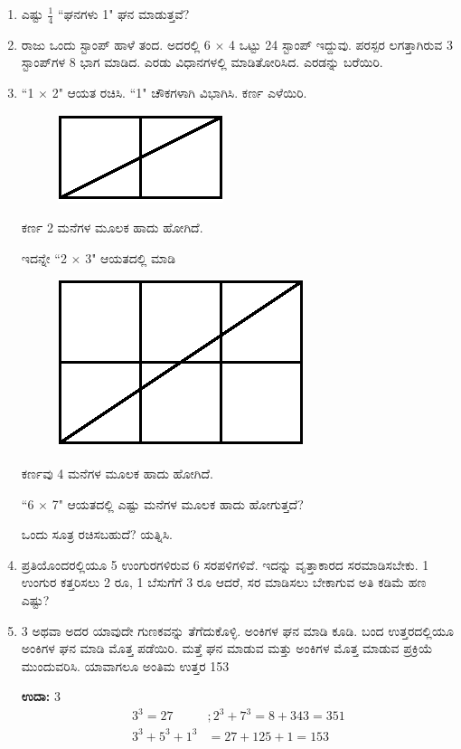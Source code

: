 \begin{enumerate}
\item ಎಷ್ಟು $\frac{1}{4}$ “ಘನಗಳು 1" ಘನ ಮಾಡುತ್ತವೆ?

\item ರಾಜು ಒಂದು ಸ್ಟಾಂಪ್ ಹಾಳೆ ತಂದ. ಅದರಲ್ಲಿ 6 $\times$ 4 ಒಟ್ಟು 24 ಸ್ಟಾಂಪ್ ಇದ್ದುವು. ಪರಸ್ಪರ ಲಗತ್ತಾಗಿರುವ 3 ಸ್ಟಾಂಪ್‌ಗಳ 8 ಭಾಗ ಮಾಡಿದ. ಎರಡು ವಿಧಾನಗಳಲ್ಲಿ ಮಾಡಿತೋರಿಸಿದ. ಎರಡನ್ನು ಬರೆಯಿರಿ.

\item “1 $\times$ 2" ಆಯತ ರಚಿಸಿ. “1" ಚೌಕಗಳಾಗಿ ವಿಭಾಗಿಸಿ. ಕರ್ಣ ಎಳೆಯಿರಿ. 
\begin{figure}[H]
\centering
\includegraphics{images/chap1/q25a.eps}
\end{figure}

ಕರ್ಣ 2 ಮನೆಗಳ ಮೂಲಕ ಹಾದು ಹೋಗಿದೆ.


ಇದನ್ನೇ “2 $\times$ 3" ಆಯತದಲ್ಲಿ ಮಾಡಿ 
\begin{figure}[H]
\centering
\includegraphics{images/chap1/q25b.eps}
\end{figure}

ಕರ್ಣವು 4 ಮನೆಗಳ ಮೂಲಕ ಹಾದು ಹೋಗಿದೆ. 


“6 $\times$ 7" ಆಯತದಲ್ಲಿ ಎಷ್ಟು ಮನೆಗಳ ಮೂಲಕ ಹಾದು ಹೋಗುತ್ತದೆ? 

ಒಂದು ಸೂತ್ರ ರಚಿಸಬಹುದೆ? ಯತ್ನಿಸಿ.

\item ಪ್ರತಿಯೊಂದರಲ್ಲಿಯೂ 5 ಉಂಗುರಗಳಿರುವ 6 ಸರಪಳಿಗಳಿವೆ. ಇದನ್ನು ವೃತ್ತಾಕಾರದ ಸರಮಾಡಿಸಬೇಕು. 1 ಉಂಗುರ ಕತ್ತರಿಸಲು 2 ರೂ, 1 ಬೆಸುಗೆಗೆ 3 ರೂ ಆದರೆ, ಸರ ಮಾಡಿಸಲು ಬೇಕಾಗುವ ಅತಿ ಕಡಿಮೆ ಹಣ ಎಷ್ಟು?

\item 3 ಅಥವಾ ಅದರ ಯಾವುದೇ ಗುಣಕವನ್ನು ತೆಗೆದುಕೊಳ್ಳಿ. ಅಂಕಿಗಳ ಘನ ಮಾಡಿ ಕೂಡಿ. ಬಂದ ಉತ್ತರದಲ್ಲಿಯೂ ಅಂಕಿಗಳ ಘನ ಮಾಡಿ ಮೊತ್ತ ಪಡೆಯಿರಿ. ಮತ್ತೆ ಘನ ಮಾಡುವ ಮತ್ತು ಅಂಕಿಗಳ ಮೊತ್ತ ಮಾಡುವ ಪ್ರಕ್ರಿಯೆ ಮುಂದುವರಿಸಿ. ಯಾವಾಗಲೂ ಅಂತಿಮ ಉತ್ತರ 153

{\bf ಉದಾ:} 3
\begin{align*}
 3^{3} = 27&; 2^{3} + 7^{3} = 8 + 343 = 351\\
3^{3} + 5^{3} + 1^{3} & = 27 + 125 + 1 = 153
\end{align*}


\end{enumerate}
